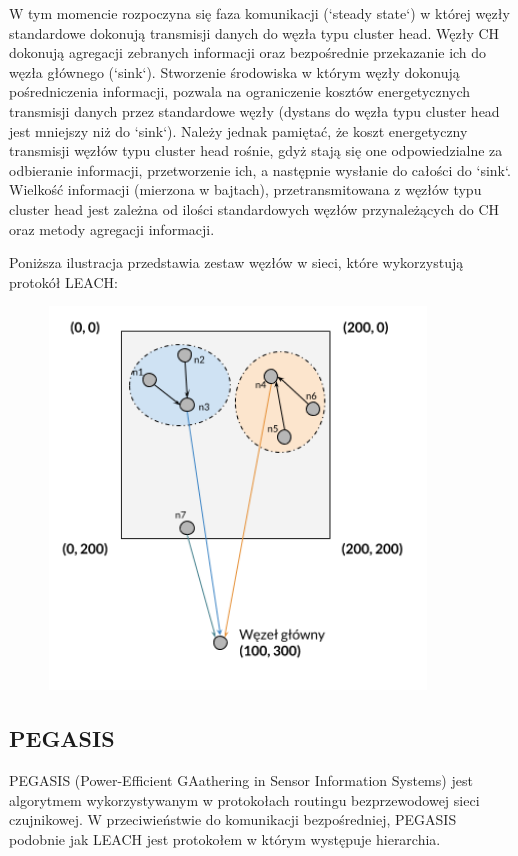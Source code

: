 \documentclass[a4paper,12pt,twoside,openany]{report}
\begin{document}
W tym momencie rozpoczyna się faza komunikacji (`steady state`) w której węzły standardowe dokonują transmisji danych do  węzła typu cluster head.
Węzły CH dokonują agregacji zebranych informacji oraz bezpośrednie przekazanie ich do węzła głównego (`sink`).
Stworzenie środowiska w którym węzły dokonują pośredniczenia informacji, pozwala na ograniczenie kosztów energetycznych transmisji danych przez
standardowe węzły (dystans do węzła typu cluster head jest mniejszy niż do `sink`). Należy jednak pamiętać, że koszt energetyczny transmisji węzłów typu cluster head rośnie, gdyż
stają się one odpowiedzialne za odbieranie informacji, przetworzenie ich, a następnie wysłanie do całości do `sink`. Wielkość informacji (mierzona w bajtach), przetransmitowana 
z węzłów typu cluster head jest zależna od ilości standardowych węzłów przynależących do CH oraz metody agregacji informacji.

Poniższa ilustracja przedstawia zestaw węzłów w sieci, które wykorzystują protokół LEACH:

\begin{figure}[H]
 \centering
 \includegraphics[width=10cm]{images/komunikacja_leach.png} 
\end{figure}

\subsection{PEGASIS}

PEGASIS (Power-Efficient GAathering in Sensor Information Systems) jest algorytmem wykorzystywanym w protokołach routingu bezprzewodowej sieci czujnikowej.
W przeciwieństwie do komunikacji bezpośredniej, PEGASIS podobnie jak LEACH jest protokołem w którym występuje hierarchia.
\end{document}
